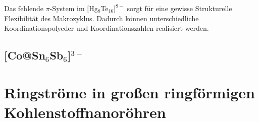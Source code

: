 %
%
%

Das fehlende $\pi$-System im $[$Hg$_8$Te$_{16}]^{8-}$ sorgt für eine gewisse Strukturelle Flexibilität des Makrozyklus. Dadurch können unterschiedliche Koordinationspolyeder und Koordinationszahlen realisiert werden.

\FloatBarrier
\subsection{\texorpdfstring{[Co@Sn$_6$Sb$_6$]$^{3-}$}{[Co at Sn\_6Sb\_6\^3-]}}
\FloatBarrier
\section{Ringströme in großen ringförmigen Kohlenstoffnanoröhren}
